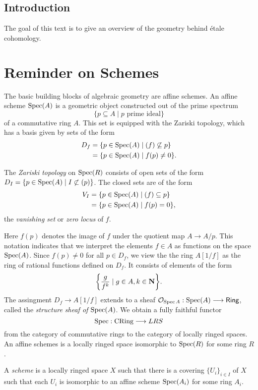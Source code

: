 \subsection{Introduction}
The goal of this text is to give an overview of the geometry behind \'etale cohomology.
\section{Reminder on Schemes}

The basic building blocks of algebraic geometry are affine schemes. An affine scheme $\operatorname{Spec}(A)$ is a geometric object constructed out of the prime spectrum 
\[
  \{p \subseteq A \mid p \text{ prime ideal}\}
\]
of a commutative ring $A$. This set is equipped with the Zariski topology, which has a basis given by sets of the form 
\begin{align*}
  D_f &= \{ p \in \operatorname{Spec}(A) \mid (f) \not \subseteq p \} \\
      &= \{ p \in \operatorname{Spec}(A) \mid f(p) \neq 0\} .
\end{align*}
\begin{definition}
    The \textit{Zariski topology} on $\operatorname{Spec}(R)$ consists of open sets of the form $D_I = \{ p \in \operatorname{Spec}(A) \mid I \not \subset (p)\}$. The closed sets are of the form
    \begin{align*}
        V_I &= \{ p \in \operatorname{Spec}(A) \mid (f) \subseteq p \} \\
            &= \{ p \in \operatorname{Spec}(A) \mid f(p) = 0\},
    \end{align*}
    the \textit{vanishing set} or \textit{zero locus} of $f$. 
\end{definition}

Here $f(p)$ denotes the image of $f$ under the quotient map $A \to A/p$. This notation indicates that we interpret the elements $f \in A$ as functions on the space $\operatorname{Spec}(A)$. Since $f(p) \neq 0$ for all $p \in D_f$, we view the the ring $A[1/f]$ as the ring of rational functions defined on $D_f$. It consists of elements of the form 
\[
  \biggl\{ \frac{g}{f^k} \mid g \in A, k \in \mathbf{N} \biggr\}.
\]
The assingment $D_f \to A[1/f]$ extends to a sheaf $\mathcal{O}_{\operatorname{Spec}{A}}: \operatorname{Spec}(A) \longrightarrow \mathsf{Ring}$, called the \textit{structure sheaf of $\operatorname{Spec}(A)$}. We obtain a fully faithful functor
\[
\operatorname{Spec} : \text{CRing} \longrightarrow LRS
\]
from the category of commutative rings to the category of locally ringed spaces. An affine schemes is a locally ringed space isomorphic to $\operatorname{Spec}(R)$ for some ring $R$.

\begin{definition}
  A \textit{scheme} is a locally ringed space $X$ such that there is a covering $\{U_i\}_{i \in I}$ of $X$ such that each $U_i$ is isomorphic to an affine scheme $\operatorname{Spec}(A_i)$ for some ring $A_i$.
\end{definition}

